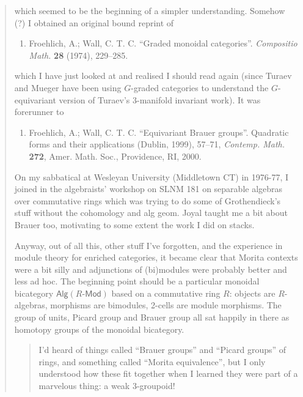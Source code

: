 \documentclass{article}
\def\tightlist{}
\begin{document}
\begin{quote}
which seemed to be the beginning of a simpler understanding. Somehow (?)
I obtained an original bound reprint of

\begin{enumerate}
\def\labelenumi{\arabic{enumi})}
\setcounter{enumi}{37}
\tightlist
\item
  Froehlich, A.; Wall, C. T. C. ``Graded monoidal categories''.
  \emph{Compositio Math.} \textbf{28} (1974), 229--285.
\end{enumerate}

which I have just looked at and realised I should read again (since
Turaev and Mueger have been using \(G\)-graded categories to understand
the \(G\)-equivariant version of Turaev's \(3\)-manifold invariant
work). It was forerunner to

\begin{enumerate}
\def\labelenumi{\arabic{enumi})}
\setcounter{enumi}{38}
\tightlist
\item
  Froehlich, A.; Wall, C. T. C. ``Equivariant Brauer groups''. Quadratic
  forms and their applications (Dublin, 1999), 57--71, \emph{Contemp.
  Math.} \textbf{272}, Amer. Math. Soc., Providence, RI, 2000.
\end{enumerate}

On my sabbatical at Wesleyan University (Middletown CT) in 1976-77, I
joined in the algebraists' workshop on SLNM 181 on separable algebras
over commutative rings which was trying to do some of Grothendieck's
stuff without the cohomology and alg geom. Joyal taught me a bit about
Brauer too, motivating to some extent the work I did on stacks.

Anyway, out of all this, other stuff I've forgotten, and the experience
in module theory for enriched categories, it became clear that Morita
contexts were a bit silly and adjunctions of (bi)modules were probably
better and less ad hoc. The beginning point should be a particular
monoidal bicategory $\mathsf{Alg}(\mbox{$R$-$\mathsf{Mod}$})$ based
on a commutative ring \(R\): objects are \(R\)-algebras, morphisms are
bimodules, 2-cells are module morphisms. The group of units, Picard
group and Brauer group all sat happily in there as homotopy groups of
the monoidal bicategory.

\begin{quote}
I'd heard of things called ``Brauer groups'' and ``Picard groups'' of
rings, and something called ``Morita equivalence'', but I only
understood how these fit together when I learned they were part of a
marvelous thing: a weak \(3\)-groupoid!
\end{quote}


\end{quote}
\end{document}
